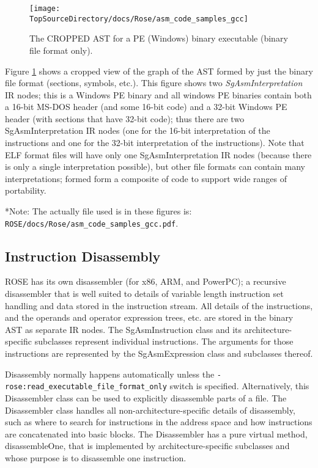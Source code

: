 \begin{figure}
\texttt{[image: \\TopSourceDirectory/docs/Rose/asm\_code\_samples\_gcc]}
\caption{The CROPPED AST for a PE (Windows) binary executable (binary file format only).} 

\label{binaryAnalysis:BinaryExecutableFormatAST_2}
\end{figure}

Figure \ref{binaryAnalysis:BinaryExecutableFormatAST_2} shows a cropped view of the graph
of the AST formed by just the binary file format (sections, symbols, etc.).  This figure
shows two {\em SgAsmInterpretation} IR nodes; this is a Windows PE binary and all windows
PE binaries contain both a 16-bit MS-DOS header (and some 16-bit code) and a 32-bit Windows
PE header (with sections that have 32-bit code); thus there are two SgAsmInterpretation IR
nodes (one for the 16-bit interpretation of the instructions and one for the 32-bit 
interpretation of the instructions).  Note that ELF format files will have only one
SgAsmInterpretation IR nodes (because there is only a single interpretation possible), but
other file formats can contain many interpretations; formed form a composite of code to
support wide ranges of portability.

*Note: The actually file used is in these figures is: {\tt ROSE/docs/Rose/asm\_code\_samples\_gcc.pdf}.

\subsection{Instruction Disassembly}

ROSE has its own disassembler (for x86, ARM, and PowerPC); a recursive disassembler that is well suited to details of variable
length instruction set handling and data stored in the instruction stream.  All details of the instructions, and the operands
and operator expression trees, etc. are stored in the binary AST as separate IR nodes.  The SgAsmInstruction class and its
architecture-specific subclasses represent individual instructions. The arguments for those instructions are represented by the
SgAsmExpression class and subclasses thereof.

Disassembly normally happens automatically unless the {\tt -rose:read\_executable\_file\_format\_only} switch is specified.
Alternatively, this Disassembler class can be used to explicitly disassemble parts of a file. The Disassembler class
handles all non-architecture-specific details of disassembly, such as where to search for instructions in the address
space and how instructions are concatenated into basic blocks.  The Disassembler has a pure virtual method,
disassembleOne, that is implemented by architecture-specific subclasses and whose purpose is to disassemble one
instruction.

